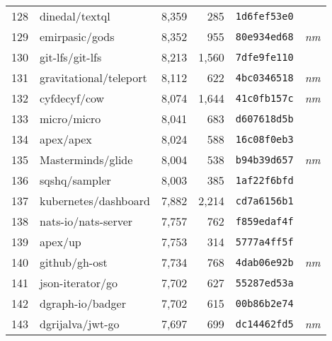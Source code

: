 {\begin{supertabular}{llrrll}
        128 &                     dinedal/textql &  8,359 &    285 &  \texttt{1d6fef53e0} &              \\
        129 &                     emirpasic/gods &  8,352 &    955 &  \texttt{80e934ed68} &  \textit{nm} \\
        130 &                    git-lfs/git-lfs &  8,213 &  1,560 &  \texttt{7dfe9fe110} &              \\
        131 &             gravitational/teleport &  8,112 &    622 &  \texttt{4bc0346518} &  \textit{nm} \\
        132 &                       cyfdecyf/cow &  8,074 &  1,644 &  \texttt{41c0fb157c} &  \textit{nm} \\
        133 &                        micro/micro &  8,041 &    683 &  \texttt{d607618d5b} &              \\
        134 &                          apex/apex &  8,024 &    588 &  \texttt{16c08f0eb3} &              \\
        135 &                  Masterminds/glide &  8,004 &    538 &  \texttt{b94b39d657} &  \textit{nm} \\
        136 &                      sqshq/sampler &  8,003 &    385 &  \texttt{1af22f6bfd} &              \\
        137 &               kubernetes/dashboard &  7,882 &  2,214 &  \texttt{cd7a6156b1} &              \\
        138 &                nats-io/nats-server &  7,757 &    762 &  \texttt{f859edaf4f} &              \\
        139 &                            apex/up &  7,753 &    314 &  \texttt{5777a4ff5f} &              \\
        140 &                      github/gh-ost &  7,734 &    768 &  \texttt{4dab06e92b} &  \textit{nm} \\
        141 &                   json-iterator/go &  7,702 &    627 &  \texttt{55287ed53a} &              \\
        142 &                   dgraph-io/badger &  7,702 &    615 &  \texttt{00b86b2e74} &              \\
        143 &                   dgrijalva/jwt-go &  7,697 &    699 &  \texttt{dc14462fd5} &  \textit{nm} \\

\end{supertabular}}
